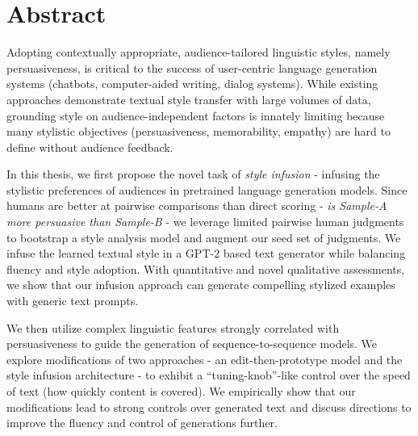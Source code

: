 \begingroup
\let\clearpage\relax
\let\cleardoublepage\relax
\let\cleardoublepage\relax

\chapter*{Abstract}
Adopting contextually appropriate, audience-tailored linguistic styles, namely persuasiveness, is critical to the success of user-centric language generation systems (\eg chatbots, computer-aided writing, dialog systems). While existing approaches demonstrate textual style transfer with large volumes of data, grounding style on audience-independent factors is innately limiting because many stylistic objectives (\eg persuasiveness, memorability, empathy) are hard to define without audience feedback.

In this thesis, we first propose the novel task of \textit{style infusion} - infusing the stylistic preferences of audiences in pretrained language generation models. Since humans are better at pairwise comparisons than direct scoring - \ie \textit{is Sample-A more persuasive than Sample-B} - we leverage limited pairwise human judgments to bootstrap a style analysis model and augment our seed set of judgments. We infuse the learned textual style in a GPT-2 based text generator while balancing fluency and style adoption. With quantitative and novel qualitative assessments, we show that our infusion approach can generate compelling stylized examples with generic text prompts. 

We then utilize complex linguistic features strongly correlated with persuasiveness to guide the generation of sequence-to-sequence models. We explore modifications of two approaches - an edit-then-prototype model and the style infusion architecture - to exhibit a ``tuning-knob''-like control over the speed of text (\ie how quickly content is covered). We empirically show that our modifications lead to strong controls over generated text and discuss directions to improve the fluency and control of generations further.

\vfill

\endgroup

\vfill
